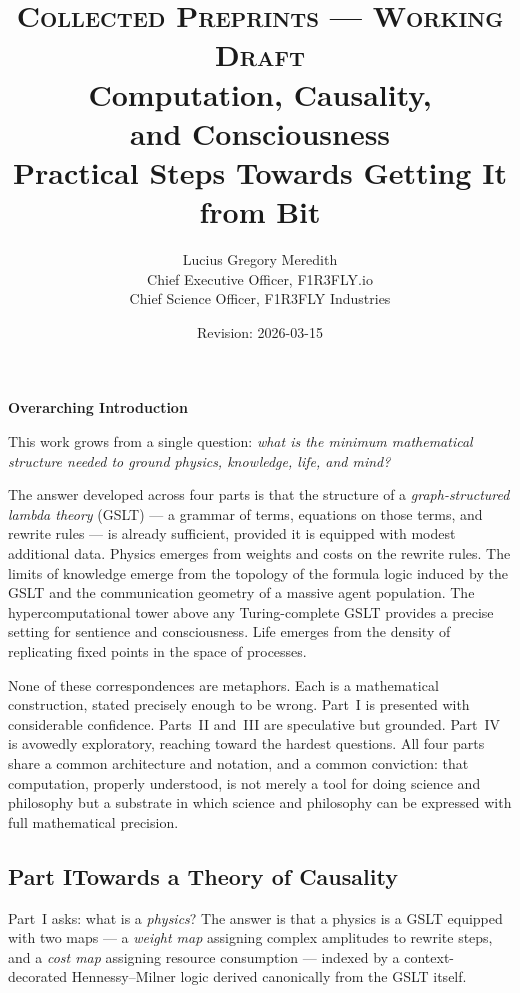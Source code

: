 \documentclass[12pt]{article}
\title{%
  \vspace{-0.8in}
  {\large\scshape Collected Preprints --- Working Draft}\\[0.6em]
  {\Huge\bfseries Computation, Causality,\\[0.2em] and Consciousness}\\[0.5em]
  {\large Practical Steps Towards Getting It from Bit}
}
\author{%
  Lucius Gregory Meredith\\[0.3em]
  {\small Chief Executive Officer, F1R3FLY.io}\\
  {\small Chief Science Officer, F1R3FLY Industries}
}
\date{Revision: 2026-03-15}
\theoremstyle{remark}
\begin{document}
\maketitle
\thispagestyle{empty}


\newpage
{}
{}
{\large\bfseries\color{accentblue} Overarching Introduction}
\vspace{0.8em}

\noindent
This work grows from a single question: \emph{what is the minimum
mathematical structure needed to ground physics, knowledge, life,
and mind?}

The answer developed across four parts is that the structure of a
\emph{graph-structured lambda theory} (GSLT) --- a grammar of terms,
equations on those terms, and rewrite rules --- is already sufficient,
provided it is equipped with modest additional data.
Physics emerges from weights and costs on the rewrite rules.
The limits of knowledge emerge from the topology of the formula
logic induced by the GSLT and the communication geometry of a
massive agent population.
The hypercomputational tower above any Turing-complete GSLT
provides a precise setting for sentience and consciousness.
Life emerges from the density of replicating fixed points in the
space of processes.

None of these correspondences are metaphors.
Each is a mathematical construction, stated precisely enough to
be wrong.
Part~I is presented with considerable confidence.
Parts~II and~III are speculative but grounded.
Part~IV is avowedly exploratory, reaching toward the hardest
questions.
All four parts share a common architecture and notation, and a
common conviction: that computation, properly understood, is not
merely a tool for doing science and philosophy but a substrate
in which science and philosophy can be expressed with full
mathematical precision.

\bigskip

\subsection*{Part I\quad Towards a Theory of Causality}

Part~I asks: what is a \emph{physics}?
The answer is that a physics is a GSLT equipped with two maps ---
a \emph{weight map} assigning complex amplitudes to rewrite steps,
and a \emph{cost map} assigning resource consumption --- indexed by
a context-decorated Hennessy--Milner logic derived canonically from
the GSLT itself.
\end{document}

